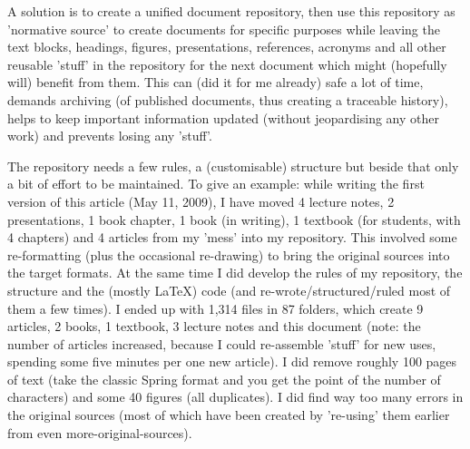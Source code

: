 A solution is to create a unified document repository, then use 
this repository as 'normative source' to create documents for specific 
purposes while leaving the text blocks, headings, figures, presentations, 
references, acronyms and all other reusable 'stuff' in the repository for 
the next document which might (hopefully will) benefit from them. This can 
(did it for me already) safe a lot of time, demands archiving (of 
published documents, thus creating a traceable history), helps to keep 
important information updated (without jeopardising any other work) and 
prevents losing any 'stuff'.

The repository needs a few rules, a (customisable) structure but beside 
that only a bit of effort to be maintained. To give an example: while 
writing the first version of this article (May 11, 2009), I have moved 4 
lecture notes, 2 presentations, 1 book chapter, 1 book (in writing), 1 
textbook (for students, with 4 chapters) and 4 articles from my 'mess' 
into my repository. This involved some re-formatting (plus the occasional 
re-drawing) to bring the original sources into the target formats. At the 
same time I did develop the rules of my repository, the structure and the 
(mostly \LaTeX) code (and re-wrote/structured/ruled most of them a few 
times). I ended up with 1,314 files in 87 folders, which create 9 articles, 2 
books, 1 textbook, 3 lecture notes and this document (note: the number of 
articles increased, because I could re-assemble 'stuff' for new uses, 
spending some five minutes per one new article). I did remove roughly 100 
pages of text (take the classic Spring  format and you get the point 
of the number of characters) and some 40 figures (all duplicates). I did 
find way too many errors in the original sources (most of which have been 
created by 're-using' them earlier from even more-original-sources).
